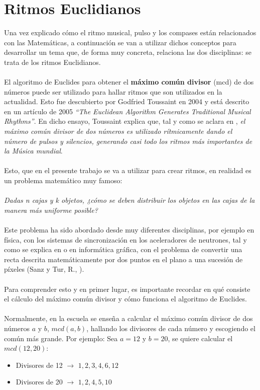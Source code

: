 \documentclass[a4paper, openright, 11pt, titlepage]{report}
\theoremstyle{definition}\newtheorem{defin}[propo]{Definition}
\theoremstyle{definition}\newtheorem{obser}[propo]{Remark}
\theoremstyle{definition}\newtheorem{ejem}[propo]{Ejemplo}
\theoremstyle{definition}\newtheorem{algoritmo}[propo]{Algoritmo}
\begin{document}
\section{Ritmos Euclidianos}
Una vez explicado cómo el ritmo musical, pulso y los compases están relacionados con las Matemáticas, a continuación se van a utilizar dichos conceptos para desarrollar un tema que, de forma muy concreta, relaciona las dos disciplinas: se trata de los ritmos Euclidianos.\\\\
El algoritmo de Euclides para obtener el \textbf{máximo común divisor} (mcd) de dos números puede ser utilizado para hallar ritmos que son utilizados en la actualidad. Esto fue descubierto por Godfried Toussaint en 2004 y está descrito en un artículo de 2005 \textit{``The Euclidean Algorithm Generates Traditional Musical Rhythms''}. En dicho ensayo, Toussaint explica que, tal y como se aclara en \cite{wikieuclides}, \textit{el máximo común divisor de dos números es utilizado rítmicamente dando el número de pulsos y silencios, generando casi todo los ritmos más importantes de la Música mundial}. \\\\
Esto, que en el presente trabajo se va a utilizar para crear ritmos, en realidad es un problema matemático muy famoso: \\\\
\textit{Dadas n cajas y k objetos, ¿cómo se deben distribuir los objetos en las cajas de la manera más uniforme posible?}\\\\
Este problema ha sido abordado desde muy diferentes disciplinas, por ejemplo en física, con los sistemas de sincronización en los aceleradores de neutrones, tal y como se explica en \cite{ritmos} o en informática gráfica, con el problema de convertir una recta descrita matemáticamente por dos puntos en el plano a una sucesión de píxeles (Sanz y Tur, R., \cite{ritmos2}).\\\\
Para comprender esto y en primer lugar, es importante recordar en qué consiste el cálculo del máximo común divisor y cómo funciona el algoritmo de Euclides.\\\\
Normalmente, en la escuela se enseña a calcular el máximo común divisor de dos números $a$ y $b$, $mcd(a, b)$, hallando los divisores de cada número y escogiendo el común más grande. Por ejemplo: Sea $a = 12$ y $b = 20$, se quiere calcular el $mcd(12,20)$: 
\begin{itemize}
    \item Divisores de 12 $\longrightarrow$ ${1, 2, 3, \boxed{4}, 6, 12}$
    \item Divisores de 20 $\longrightarrow$ ${1, 2, \boxed{4}, 5, 10}$
\end{itemize}
\end{document}
